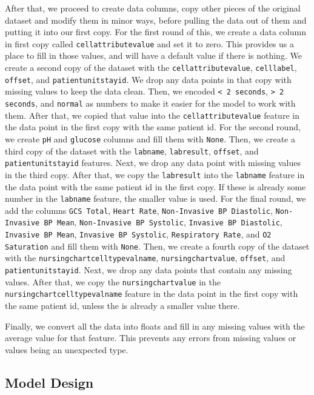 \documentclass{article}
\begin{document}
After that, we proceed to create data columns, copy other pieces of the original dataset and modify them in minor ways, before pulling the data out of them and putting it into our first copy. For the first round of this, we create a data column in first copy called \texttt{cellattributevalue} and set it to zero. This provides us a place to fill in those values, and will have a default value if there is nothing. We create a second copy of the dataset with the \texttt{cellattributevalue}, \texttt{celllabel}, \texttt{offset}, and \texttt{patientunitstayid}. We drop any data points in that copy with missing values to keep the data clean. Then, we encoded \texttt{< 2 seconds}, \texttt{> 2 seconds}, and \texttt{normal} as numbers to make it easier for the model to work with them. After that, we copied that value into the \texttt{cellattributevalue} feature in the data point in the first copy with the same patient id. For the second round, we create \texttt{pH} and \texttt{glucose} columns and fill them with \texttt{None}. Then, we create a third copy of the dataset with the \texttt{labname}, \texttt{labresult}, \texttt{offset}, and \texttt{patientunitstayid} features. Next, we drop any data point with missing values in the third copy. After that, we copy the \texttt{labresult} into the \texttt{labname} feature in the data point with the same patient id in the first copy. If these is already some number in the \texttt{labname} feature, the smaller value is used. For the final round, we add the columns \texttt{GCS Total}, \texttt{Heart Rate}, \texttt{Non-Invasive BP Diastolic}, \texttt{Non-Invasive BP Mean}, \texttt{Non-Invasive BP Systolic}, \texttt{Invasive BP Diastolic}, \texttt{Invasive BP Mean}, \texttt{Invasive BP Systolic}, \texttt{Respiratory Rate}, and \texttt{O2 Saturation} and fill them with \texttt{None}. Then, we create a fourth copy of the dataset with the \texttt{nursingchartcelltypevalname}, \texttt{nursingchartvalue}, \texttt{offset}, and \texttt{patientunitstayid}. Next, we drop any data points that contain any missing values. After that, we copy the \texttt{nursingchartvalue} in the \texttt{nursingchartcelltypevalname} feature in the data point in the first copy with the same patient id, unless the is already a smaller value there. 

Finally, we convert all the data into floats and fill in any missing values with the average value for that feature. This prevents any errors from missing values or values being an unexpected type. 

\subsection{Model Design}
\end{document}
